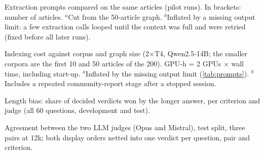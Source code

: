 \documentclass{article}
\begin{document}
\begin{table}[h]
\caption{Extraction prompts compared on the same articles (pilot runs). In brackets: number of
articles. $^a$Cut from the 50-article graph. $^b$Inflated by a missing output limit: a few
extraction calls looped until the context was full and were retried (fixed before all later runs).}
\label{tab:prompts}
\vskip 0.05in
\begin{center}\begin{small}

\end{small}\end{center}
\end{table}

\begin{table}[t]
\caption{Indexing cost against corpus and graph size (2$\times$T4, Qwen2.5-14B; the smaller corpora are
the first 10 and 50 articles of the 200). GPU-h = 2 GPUs $\times$ wall time, including start-up.
$^a$Inflated by the missing output limit (\cref{tab:prompts}). $^b$Includes a repeated
community-report stage after a stopped session.}
\label{tab:graphsize}
\vskip 0.05in
\begin{center}\begin{small}

\end{small}\end{center}
\end{table}

\begin{table}[h]
\caption{Length bias: share of decided verdicts won by the longer answer, per criterion and judge (all 60
questions, development and test).}
\label{tab:lengthbias}
\vskip 0.05in
\begin{center}\begin{small}

\end{small}\end{center}
\end{table}

\begin{table}[h]
\caption{Agreement between the two LLM judges (Opus and Mistral), test split, three pairs at 12k; both display orders netted into one verdict per question, pair and criterion.}
\label{tab:judgeagreement}
\vskip 0.05in
\begin{center}\begin{small}

\end{small}\end{center}
\end{table}
\end{document}
